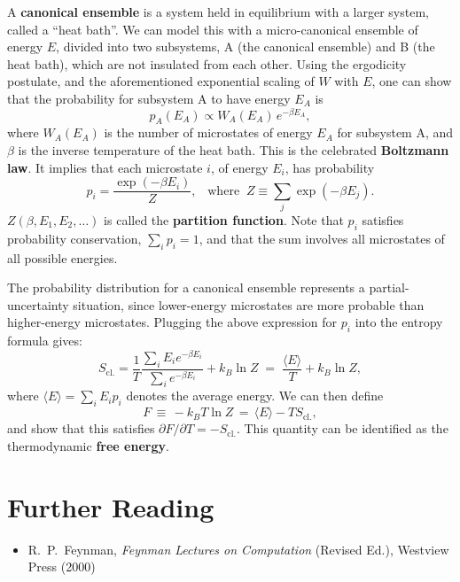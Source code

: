 \documentclass[pra,12pt]{revtex4}
\begin{document}
A \textbf{canonical ensemble} is a system held in equilibrium with a
larger system, called a ``heat bath''.  We can model this with a
micro-canonical ensemble of energy $E$, divided into two subsystems, A
(the canonical ensemble) and B (the heat bath), which are not
insulated from each other.  Using the ergodicity postulate, and the
aforementioned exponential scaling of $W$ with $E$, one can show that
the probability for subsystem A to have energy $E_A$ is
$$p_A(E_A) \propto W_A(E_A) \, e^{-\beta E_A},$$
where $W_A(E_A)$ is the number of microstates of energy $E_A$ for
subsystem A, and $\beta$ is the inverse temperature of the heat bath.
This is the celebrated \textbf{Boltzmann law}.  It implies that each
microstate $i$, of energy $E_i$, has probability
$$p_i = \frac{\exp(-\beta E_i)}{Z}, \;\;\;\mathrm{where}\;\;Z \equiv \sum_j \exp(-\beta E_j).$$
$Z(\beta,E_1, E_2,\dots)$ is called the \textbf{partition function}.
Note that $p_i$ satisfies probability conservation, $\sum_i p_i = 1$,
and that the sum involves all microstates of all possible energies.

The probability distribution for a canonical ensemble represents a
partial-uncertainty situation, since lower-energy microstates are
more probable than higher-energy microstates.  Plugging the above
expression for $p_i$ into the entropy formula gives:
$$S_{\mathrm{cl.}} = \frac{1}{T} \frac{\sum_i E_i e^{-\beta E_i}}{\sum_i e^{-\beta E_i}} + k_B \ln Z \;=\; \frac{\langle E\rangle}{T} + k_B \ln Z,$$
where $\langle E\rangle = \sum_i E_i p_i$ denotes the average energy.
We can then define
$$F \,\equiv\, - k_B T \ln Z \,=\, \langle E \rangle - TS_{\mathrm{cl.}},$$
and show that this satisfies $\partial F/\partial T = -
S_{\mathrm{cl.}}$.  This quantity can be identified as the
thermodynamic \textbf{free energy}.

\section*{Further Reading}

\begin{itemize}
\item R.~P.~Feynman, \textit{Feynman Lectures on Computation} (Revised
  Ed.), Westview Press (2000)
\label{cite:feynman}
\end{itemize}
\end{document}
